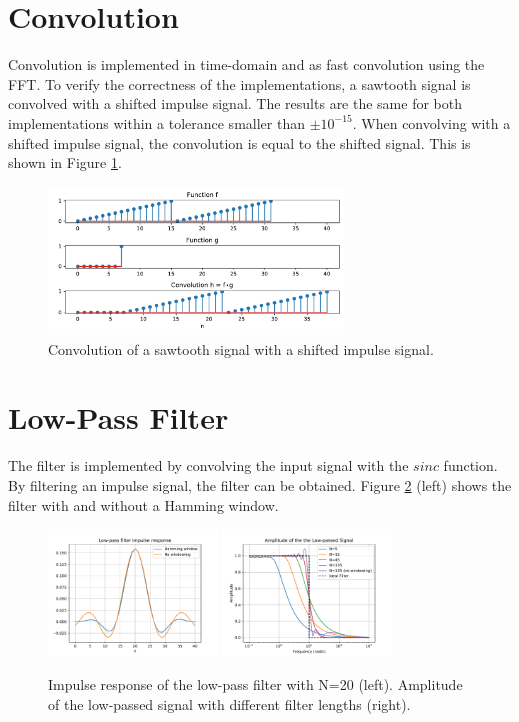 \documentclass[12pt, a4paper]{report}
\begin{document}
\section{Convolution}

Convolution is implemented in time-domain and as fast convolution using the \ac{FFT}.
To verify the correctness of the implementations,
a sawtooth signal is convolved with a shifted impulse signal.
The results are the same for both implementations within a tolerance smaller than \(\pm10^{-15}\).
When convolving with a shifted impulse signal, the convolution is equal to the shifted signal.
This is shown in Figure \ref{fig:convolution}.
\begin{figure}[h!]
	\centering
	\includegraphics[width=0.7\textwidth]{figures/convolution.pdf}
	\caption{Convolution of a sawtooth signal with a shifted impulse signal.}
	\label{fig:convolution}
\end{figure}

\section{Low-Pass Filter}

The filter is implemented by convolving the input signal with the \(sinc\) function.
By filtering an impulse signal, the filter can be obtained.
Figure \ref{fig:low_pass_filter} (left) shows the filter with and without a Hamming window.

\begin{figure}[h!]
	\centering
	\includegraphics[width=0.4\textwidth]{figures/impulse_response.pdf}
	\includegraphics[width=0.4\textwidth]{figures/passband.pdf}
	\caption{Impulse response of the low-pass filter with N=20 (left). Amplitude of the low-passed signal with different filter lengths (right).}
	\label{fig:low_pass_filter}
\end{figure}
\end{document}

